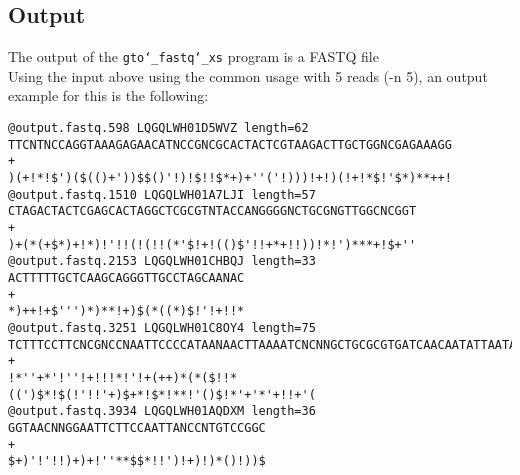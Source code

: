\subsection*{Output}
The output of the \texttt{gto\char`_fastq\char`_xs} program is a FASTQ file\\
Using the input above using the common usage with 5 reads (-n 5), an output example for this is the following:
\begin{lstlisting}
@output.fastq.598 LQGQLWH01D5WVZ length=62
TTCNTNCCAGGTAAAGAGAACATNCCGNCGCACTACTCGTAAGACTTGCTGGNCGAGAAAGG
+
)(+!*!$')($(()+'))$$()'!)!$!!$*+)+''('!)))!+!)(!+!*$!'$*)**++!
@output.fastq.1510 LQGQLWH01A7LJI length=57
CTAGACTACTCGAGCACTAGGCTCGCGTNTACCANGGGGNCTGCGNGTTGGCNCGGT
+
)+(*(+$*)+!*)!'!!(!(!!(*'$!+!(()$'!!+*+!!))!*!')***+!$+''
@output.fastq.2153 LQGQLWH01CHBQJ length=33
ACTTTTTGCTCAAGCAGGGTTGCCTAGCAANAC
+
*)++!+$''')*)**!+)$(*((*)$!'!+!!*
@output.fastq.3251 LQGQLWH01C8OY4 length=75
TCTTTCCTTCNCGNCCNAATTCCCCATAANAACTTAAAATCNCNNGCTGCGCGTGATCAACAATATTAATACTCC
+
!*''+*'!''!+!!!*!'!+(++)*(*($!!*((')$*!$(!'!!'+)$+*!$*!**!'()$!*'+'*'+!!+'(
@output.fastq.3934 LQGQLWH01AQDXM length=36
GGTAACNNGGAATTCTTCCAATTANCCNTGTCCGGC
+
$+)'!'!!)+)+!''**$$*!!')!+)!)*()!))$
\end{lstlisting}